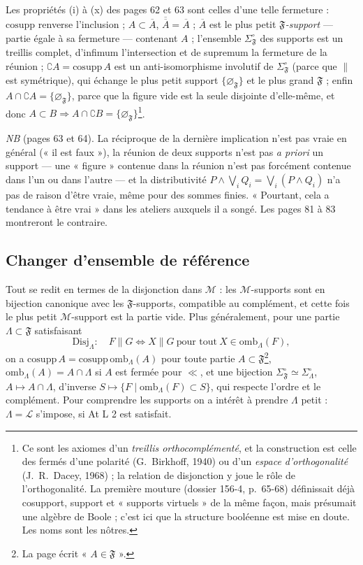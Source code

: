 \documentclass[11pt,a4paper]{article}
\begin{document}
Les propriétés (i) à (x) des pages 62 et 63 sont celles d'une telle fermeture :
$\mathrm{cosupp}$ renverse l'inclusion ; $A \subset \overline{A}$,
$\overline{\overline{A}} = \overline{A}$ ; $\overline{A}$ est le plus petit
\emph{$\mathfrak{F}$-support} --- partie égale à sa fermeture --- contenant $A$ ;
l'ensemble $\Sigma^{\circ}_{\mathfrak{F}}$ des supports est un treillis complet,
d'infimum l'intersection et de supremum la fermeture de la réunion ; $\complement
A = \mathrm{cosupp}\, A$ est un anti-isomorphisme involutif de
$\Sigma^{\circ}_{\mathfrak{F}}$ (parce que $\parallel$ est symétrique), qui échange
le plus petit support $\{\varnothing_{\mathfrak{F}}\}$ et le plus grand
$\mathfrak{F}$ ; enfin $A \cap \complement A = \{\varnothing_{\mathfrak{F}}\}$,
parce que la figure vide est la seule disjointe d'elle-même, et donc $A \subset B
\Rightarrow A \cap \complement B = \{\varnothing_{\mathfrak{F}}\}$\footnote{Ce
sont les axiomes d'un \emph{treillis orthocomplémenté}, et la construction est
celle des fermés d'une polarité (G.~Birkhoff, 1940) ou d'un \emph{espace
d'orthogonalité} (J.~R.~Dacey, 1968) ; la relation de disjonction y joue le rôle
de l'orthogonalité. La première mouture (dossier 156-4, p.~65-68) définissait déjà
cosupport, support et « supports virtuels » de la même façon, mais présumait une
algèbre de Boole ; c'est ici que la structure booléenne est mise en doute. Les
noms sont les nôtres.}.

\emph{NB} (pages 63 et 64). La réciproque de la dernière implication n'est pas vraie
en général (« il est faux »), la réunion de deux supports n'est pas \emph{a priori}
un support --- une « figure » contenue dans la réunion n'est pas forcément contenue
dans l'un ou dans l'autre --- et la distributivité $P \wedge \bigvee_{i} Q_{i} =
\bigvee_{i} (P \wedge Q_{i})$ n'a pas de raison d'être vraie, même pour des sommes
finies. « Pourtant, cela a tendance à être vrai » dans les ateliers auxquels il a
songé. Les pages 81 à 83 montreront le contraire.

\subsection*{Changer d'ensemble de référence}

Tout se redit en termes de la disjonction dans $\mathcal{M}$ : les
$\mathcal{M}$-supports sont en bijection canonique avec les $\mathfrak{F}$-supports,
compatible au complément, et cette fois le plus petit $\mathcal{M}$-support est la
partie vide. Plus généralement, pour une partie $\Lambda \subset \mathfrak{F}$
satisfaisant
\[
\mathrm{Disj}_{\Lambda} : \quad F \parallel G \iff X \parallel G \ \text{pour
tout}\ X \in \mathrm{omb}_{\Lambda}(F) ,
\]
on a $\mathrm{cosupp}\, A = \mathrm{cosupp}\, \mathrm{omb}_{\Lambda}(A)$ pour toute
partie $A \subset \mathfrak{F}$\footnote{La page écrit « $A \in \mathfrak{F}$ ».},
$\mathrm{omb}_{\Lambda}(A) = A \cap \Lambda$ si $A$ est fermée pour $\ll$, et une
bijection $\Sigma^{\circ}_{\mathfrak{F}} \simeq \Sigma^{\circ}_{\Lambda}$, $A \mapsto
A \cap \Lambda$, d'inverse $S \mapsto \{F \mid \mathrm{omb}_{\Lambda}(F) \subset
S\}$, qui respecte l'ordre et le complément. Pour comprendre les supports on a
intérêt à prendre $\Lambda$ petit : $\Lambda = \mathcal{L}$ s'impose, si At L 2 est
satisfait.
\end{document}
